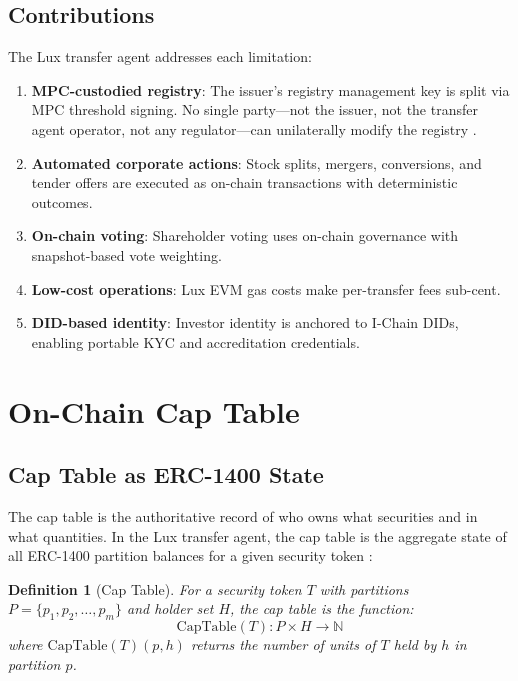 \documentclass[11pt,a4paper]{article}
\newtheorem{definition}{Definition}
\begin{document}
\subsection{Contributions}

The Lux transfer agent addresses each limitation:

\begin{enumerate}[nosep]
  \item \textbf{MPC-custodied registry}: The issuer's registry management key is split via MPC threshold signing. No single party---not the issuer, not the transfer agent operator, not any regulator---can unilaterally modify the registry \cite{lux-mchain-mpc, lux-ats-architecture}.
  \item \textbf{Automated corporate actions}: Stock splits, mergers, conversions, and tender offers are executed as on-chain transactions with deterministic outcomes.
  \item \textbf{On-chain voting}: Shareholder voting uses on-chain governance with snapshot-based vote weighting.
  \item \textbf{Low-cost operations}: Lux EVM gas costs make per-transfer fees sub-cent.
  \item \textbf{DID-based identity}: Investor identity is anchored to I-Chain DIDs, enabling portable KYC and accreditation credentials.
\end{enumerate}

\section{On-Chain Cap Table}\label{sec:captable}

\subsection{Cap Table as ERC-1400 State}

The cap table is the authoritative record of who owns what securities and in what quantities. In the Lux transfer agent, the cap table is the aggregate state of all ERC-1400 partition balances for a given security token \cite{lux-security-token-standard}:

\begin{definition}[Cap Table]
For a security token $T$ with partitions $P = \{p_1, p_2, \ldots, p_m\}$ and holder set $H$, the cap table is the function:
\[
\text{CapTable}(T) : P \times H \to \mathbb{N}
\]
where $\text{CapTable}(T)(p, h)$ returns the number of units of $T$ held by $h$ in partition $p$.
\end{definition}
\end{document}
